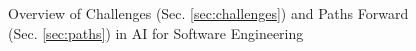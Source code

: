 \begin{figure}
\begin{tikzpicture}
    \end{tikzpicture}
    \caption{Overview of Challenges (Sec. \ref{sec:challenges}) and  Paths Forward (Sec. \ref{sec:paths}) in AI for Software Engineering}
    \label{fig:challenges-paths}
\end{figure}

